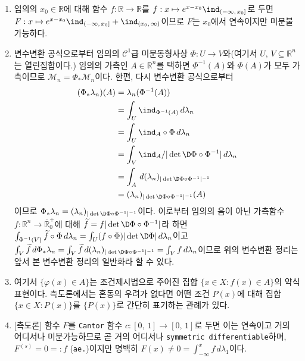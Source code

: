\begin{enumerate}[label = \textsf{\textbf{\arabic*}}]
    \item 임의의 $x_0\in\mathbb{R}$에 대해 함수 $f:\mathbb{R}\to\mathbb{R}$를 $f:x\mapsto e^{x-x_0}\ind_{(-\infty,\,x_0]}$로 두면 $F:x\mapsto e^{x-x_0}\ind_{(-\infty,\,x_0]}+\ind_{(x_0,\,\infty)}$이므로 $F$는 $x_0$에서 연속이지만 미분불가능하다.
    \item 변수변환 공식으로부터 임의의 $\mathcal{C}^1$급 미분동형사상 $\Phi:U\to V$와(여기서 $U,\,V\subseteq\mathbb{R}^n$는 열린집합이다.) 임의의 가측인 $A\in\mathbb{R}^n$를 택하면 $\Phi^{-1}(A)$와 $\Phi(A)$가 모두 가측이므로 $\mathcal{M}_n=\Phi_*\mathcal{M}_n$이다. 한편, 다시 변수변환 공식으로부터
    \begin{align*}
        (\Phi_*\lambda_n)(A)&=\lambda_n(\Phi^{-1}(A))\\
        &=\int_U\ind_{\Phi^{-1}(A)}\,d\lambda_n\\
        &=\int_U\ind_A\circ\Phi\,d\lambda_n\\
        &=\int_V\ind_A/|\det\D\Phi\circ\Phi^{-1}|\,d\lambda_n\\
        &=\int_A\,d(\lambda_n)_{|\det\D\Phi\circ\Phi^{-1}|^{-1}}\\
        &=(\lambda_n)_{|\det\D\Phi\circ\Phi^{-1}|^{-1}}(A)
    \end{align*}
    이므로 $\Phi_*\lambda_n=(\lambda_n)_{|\det\D\Phi\circ\Phi^{-1}|^{-1}}$이다. 이로부터 임의의 음이 아닌 가측함수 $f:\mathbb{R}^n\to\overline{\mathbb{R}}^+_0$에 대해 $\widetilde{f}=f|\det\D\Phi\circ\Phi^{-1}|$라 하면 $\int_{\Phi^{-1}(V)}\widetilde{f}\circ\Phi\,d\lambda_n=\int_U(f\circ\Phi)|\det\D\Phi|\,d\lambda_n$이고 $\int_V\widetilde{f}\,d\Phi_*\lambda_n=\int_V\widetilde{f}\,d(\lambda_n)_{|\det\D\Phi\circ\Phi^{-1}|^{-1}}=\int_Vf\,d\lambda_n$이므로 위의 변수변환 정리는 앞서 본 변수변환 정리의 일반화라 할 수 있다.
    \item 여기서 $\{\varphi(x)\in A\}$는 조건제시법으로 주어진 집합 $\{x\in X:f(x)\in A\}$의 약식 표현이다. 측도론에서는 혼동의 우려가 없다면 어떤 조건 $P(x)$에 대해 집합 $\{x\in X:P(x)\}$를 $\{P(x)\}$로 간단히 표기하는 관례가 있다.
    \item \textsf{[측도론]} 함수 $F$를 \texttt{Cantor} 함수 $c:[0,\,1]\to[0,\,1]$로 두면 이는 연속이고 거의 어디서나 미분가능하므로 곧 거의 어디서나 \texttt{symmetric differentiable}하며, $F^{(s)}=0=:f$ (\texttt{ae.})이지만 명백히 $F(x)\ne0=\int_{-\infty}^xf\,d\lambda_1$이다.

\end{enumerate}
